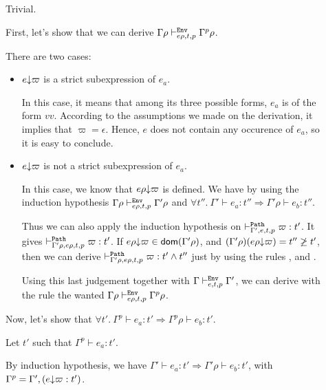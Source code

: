 \documentclass[a4paper]{article}
\theoremstyle{definition}
\begin{document}
\begin{description}
          \item[] Trivial.
          \item[] First, let's show that we can derive $\Gamma\rho \evdash p {e\rho} {t} {\Gamma^p}\rho$.
          
          There are two cases:
          \begin{itemize}
            \item $\occ e \varpi$ is a strict subexpression of $e_a$.
            
            In this case, it means that among its three possible forms,
            $e_a$ is of the form $v v$.
            According to the assumptions we made on the derivation, it implies that $\varpi=\epsilon$.
            Hence, $e$ does not contain any occurence of $e_a$, so it is easy to conclude.

            \item $\occ e \varpi$ is not a strict subexpression of $e_a$.
            
            In this case, we know that $\occ {e\rho} \varpi$ is defined.
            We have by using the induction hypothesis $\Gamma\rho \evdash p {e\rho} t \Gamma'\rho$
            and $\forall t''.\ \Gamma' \vdash e_a : t'' \Rightarrow \Gamma'\rho \vdash e_b:t''$.

            Thus we can also apply the induction hypothesis on $\pvdash {\Gamma'} p {e} t \varpi:t'$.
            It gives $\pvdash {\Gamma'\rho} p {e\rho} t \varpi:t'$.
            If $\occ {e\rho}\varpi \in\dom{\Gamma'\rho}$, and $(\Gamma'\rho)(\occ {e\rho}\varpi)=t''\not\geq t'$,
            then we can derive $\pvdash {\Gamma'\rho} p {e\rho} t \varpi:t'\land t''$ just by using the rules
            ,  and .

            Using this last judgement together with $\Gamma \evdash p e t \Gamma'$, we can derive with the rule 
            the wanted $\Gamma\rho \evdash p {e\rho} {t} {\Gamma^p}\rho$.
          \end{itemize}

          Now, let's show that $\forall t'.\ \Gamma^p \vdash e_a : t' \Rightarrow \Gamma^p\rho \vdash e_b:t'$.

          Let $t'$ such that $\Gamma^p\vdash e_a:t'$.

          By induction hypothesis, we have $\Gamma' \vdash e_a : t' \Rightarrow \Gamma'\rho \vdash e_b:t'$,
          with $\Gamma^p = \Gamma',(\occ e \varpi: t')$.


\end{description}
\end{document}
